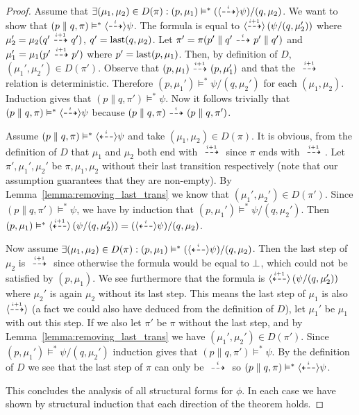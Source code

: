 \begin{proof}
    \rtl Assume that $\exists (\mu_1,\mu_2) \in D(\pi) : (p,\mu_1) \vDash^* (\mbox{\ensuremath{\langle\stackrel{_{i}}{\dashrightarrow}\rangle}}
    \psi)/(q,\mu_2)$. 
    We want to show that $(p\parallel q,\pi) \vDash^* \mbox{\ensuremath{\langle\stackrel{_{i}}{\dashrightarrow}\rangle}}\psi$.
    The formula is equal to $\mbox{\ensuremath{\langle\stackrel{_{i+1}}{\dashrightarrow}\rangle}} \left( \psi / (q,\mu_2') \right)$
    where $\mu_2' = \mu_2(q' \ {\stackrel{_{i+1}}{\dashrightarrow}}\  q')$, $q' = \operatorname{last}(q,\mu_2)$. Let $\pi' = \pi
    (p'\parallel q' \ {\stackrel{_{i}}{\dashrightarrow}}\  p'\parallel q')$ and $\mu_1' = \mu_1(p'\ {\stackrel{_{i+1}}{\dashrightarrow}}\  p')$
    where $p' = \operatorname{last}(p,\mu_1)$. Then, by definition of $D$, $(\mu_1',\mu_2') \in D(\pi')$.
    Observe that $(p,\mu_1)\ {\stackrel{_{i+1}}{\dashrightarrow}}\ (p,\mu_1')$ and that the $\ {\stackrel{_{i+1}}{\dashrightarrow}}\ $ relation
    is deterministic. Therefore
    $(p,\mu_1')\vDash^* \psi/(q,\mu_2')$ for each $(\mu_1,\mu_2)$. 
    Induction gives that $(p\parallel q, \pi')
    \vDash^* \psi$. Now it follows trivially that $(p\parallel q,\pi) \vDash^* \mbox{\ensuremath{\langle\stackrel{_{i}}{\dashrightarrow}\rangle}}
    \psi$ because $(p\parallel q, \pi)\ {\stackrel{_{i}}{\dashrightarrow}}\ (p\parallel q, \pi')$.


    \par\nobreak
    \ltr Assume $(p\parallel q, \pi) \vDash^* \mbox{\ensuremath{\langle\stackrel{_{i}}{\dashleftarrow}\rangle}}\psi$ and take $(\mu_1,\mu_2)
    \in D(\pi)$. It is obvious, from the definition of $D$ that $\mu_1$ and $\mu_2$ both
    end with $\ {\stackrel{_{i+1}}{\dashrightarrow}}\ $ since $\pi$ ends with $\ {\stackrel{_{i+1}}{\dashrightarrow}}\ $. Let $\pi', \mu_1', \mu_2'$
    be $\pi,\mu_1,\mu_2$ without their last transition respectively (note that our assumption
    guarantees that they are non-empty). By Lemma~\ref{lemma:removing_last_trans} we know
    that $(\mu_1',\mu_2') \in D(\pi')$. Since $(p\parallel q,\pi') \vDash^* \psi$, we have
    by induction that $(p,\mu_1')\vDash^* \psi/(q,\mu_2')$. Then $(p,\mu_1)\vDash^*
    \mbox{\ensuremath{\langle\stackrel{_{i+1}}{\dashleftarrow}\rangle}} \left( \psi/(q,\mu_2') \right) = (\mbox{\ensuremath{\langle\stackrel{_{i}}{\dashleftarrow}\rangle}}\psi)/(q,\mu_2)$.

    \rtl Now assume $\exists (\mu_1,\mu_2) \in D(\pi) : (p,\mu_1) \vDash^* (\mbox{\ensuremath{\langle\stackrel{_{i}}{\dashleftarrow}\rangle}}
    \psi)/(q,\mu_2)$. Then the last step of $\mu_2$ is $\ {\stackrel{_{i+1}}{\dashrightarrow}}\ $ since otherwise
    the formula would be equal to $\bot$, which could not be satisfied by $(p,\mu_1)$.
    We see furthermore that the formula is $\mbox{\ensuremath{\langle\stackrel{_{i+1}}{\dashleftarrow}\rangle}}\left(\psi/(q,\mu_2')\right)$ where
    $\mu_2'$ is again $\mu_2$ without its last step. This means the last step of $\mu_1$
    is also $\mbox{\ensuremath{\langle\stackrel{_{i+1}}{\dashrightarrow}\rangle}}$ (a fact we could also have deduced from the definition of $D$),
    let $\mu_1'$ be $\mu_1$ with out this step. If we also let $\pi'$ be $\pi$ without the
    last step, and by Lemma~\ref{lemma:removing_last_trans} we have
    $(\mu_1',\mu_2')\in D(\pi')$. Since
    $(p,\mu_1')\vDash^* \psi/(q,\mu_2')$ induction gives that $(p\parallel q,\pi')\vDash^*
    \psi$. By the definition of $D$ we see that the last step of $\pi$ can only be $\ {\stackrel{_{i}}{\dashrightarrow}}\ $
    so $(p\parallel q, \pi)\vDash^* \mbox{\ensuremath{\langle\stackrel{_{i}}{\dashleftarrow}\rangle}} \psi$.

    \vspace{1em}

    This concludes the analysis of all structural forms for $\phi$. In each case we have
    shown by structural induction that each direction of the theorem holds.
\end{proof}

